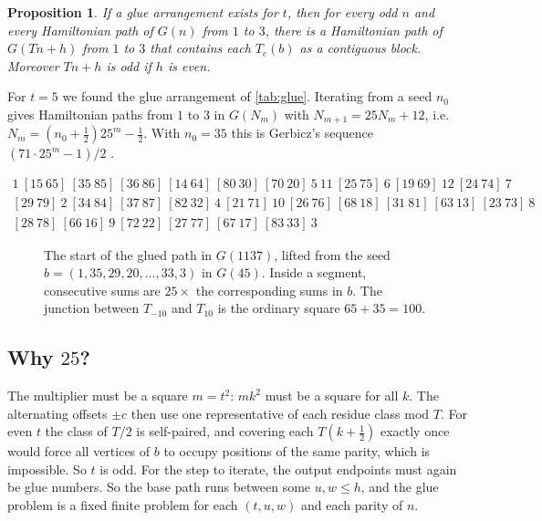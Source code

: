 \documentclass[11pt]{amsart}
\newtheorem{proposition}[theorem]{Proposition}
\theoremstyle{definition}
\begin{document}
\begin{proposition}\label{prop:lift}
If a glue arrangement exists for $t$, then for every odd $n$ and every Hamiltonian
path of $G(n)$ from $1$ to $3$, there is a Hamiltonian path of $G(Tn+h)$ from $1$ to $3$
that contains each $T_c(b)$ as a contiguous block. Moreover $Tn+h$ is odd if $h$ is even.
\end{proposition}

For $t=5$ we found the glue arrangement of \cref{tab:glue}. Iterating from a seed $n_0$
gives Hamiltonian paths from $1$ to $3$ in $G(N_m)$ with
$N_{m+1}=25N_m+12$, i.e.\ $N_m=(n_0+\frac12)25^m-\frac12$. With
$n_0=35$ this is Gerbicz's sequence $(71\cdot25^m-1)/2$ \cite{OEIS-A090461}.

\begin{table}[h]
\small
\[
\begin{array}{l}
1\ [15\ 65]\ [35\ 85]\ [36\ 86]\ [14\ 64]\ [80\ 30]\ [70\ 20]\ 5\ 11\ [25\ 75]\ 6\ [19\ 69]\ 12\ [24\ 74]\ 7\\
{}[29\ 79]\ 2\ [34\ 84]\ [37\ 87]\ [82\ 32]\ 4\ [21\ 71]\ 10\ [26\ 76]\ [68\ 18]\ [31\ 81]\ [63\ 13]\ [23\ 73]\ 8\\
{}[28\ 78]\ [66\ 16]\ 9\ [72\ 22]\ [27\ 77]\ [67\ 17]\ [83\ 33]\ 3
\end{array}
\]
\caption{A glue arrangement for $t=5$. A bracket $[x\ y]$ denotes the segment
$T_c$ with endpoints $\{x,y\}=\{25+c,75+c\}$, traversed from $x$ to $y$ (so
$[80\ 30]$ is $T_5$ reversed). Unbracketed entries are glue vertices. Each of the
$36$ junctions, i.e.\ each pair of consecutive entries not inside one bracket, sums to a square:
$1+15=16$, $65+35=100$, $85+36=121$, \dots, $33+3=36$.}
\label{tab:glue}
\end{table}

\begin{figure}[h]
\centering
\resizebox{\linewidth}{!}{}
\caption{The start of the glued path in $G(1137)$, lifted from the seed
$b=(1,35,29,20,\dots,33,3)$ in $G(45)$. Inside a segment, consecutive sums are
$25\times$ the corresponding sums in $b$. The junction between $T_{-10}$ and $T_{10}$ is
the ordinary square $65+35=100$.}
\label{fig:gluing}
\end{figure}

\subsection{Why $25$?}
The multiplier must be a square $m=t^2$: $mk^2$ must be a square for all $k$. The
alternating offsets $\pm c$ then use one representative of each residue class mod $T$.
For even $t$ the class of $T/2$ is self-paired, and covering each $T(k+\frac12)$
exactly once would force all vertices of $b$ to occupy positions of the same parity,
which is impossible. So $t$ is odd. For the step to iterate, the output endpoints
must again be glue numbers. So the base path runs between some $u,w\le h$, and
the glue problem is a fixed finite problem for each $(t,u,w)$ and each parity of $n$.
\end{document}
